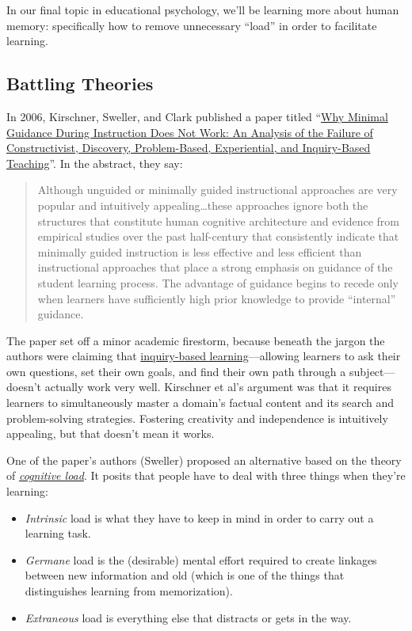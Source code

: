 
In our final topic in educational psychology, we'll be learning more
about human memory: specifically how to remove unnecessary ``load'' in
order to facilitate learning.

\subsection{Battling Theories}\label{battling-theories}

In 2006, Kirschner, Sweller, and Clark published a paper titled
``\href{http://www.cogtech.usc.edu/publications/kirschner\_Sweller\_Clark.pdf}{Why
Minimal Guidance During Instruction Does Not Work: An Analysis of the
Failure of Constructivist, Discovery, Problem-Based, Experiential, and
Inquiry-Based Teaching}''. In the abstract, they say:

\begin{quote}
Although unguided or minimally guided instructional approaches are very
popular and intuitively appealing\ldots{}these approaches ignore both
the structures that constitute human cognitive architecture and evidence
from empirical studies over the past half-century that consistently
indicate that minimally guided instruction is less effective and less
efficient than instructional approaches that place a strong emphasis on
guidance of the student learning process. The advantage of guidance
begins to recede only when learners have sufficiently high prior
knowledge to provide ``internal'' guidance.
\end{quote}

The paper set off a minor academic firestorm, because beneath the jargon
the authors were claiming that
\href{https://en.wikipedia.org/wiki/Inquiry-based\_learning}{inquiry-based
learning}---allowing learners to ask their own questions, set their own
goals, and find their own path through a subject---doesn't actually work
very well. Kirschner et al's argument was that it requires learners to
simultaneously master a domain's factual content and its search and
problem-solving strategies. Fostering creativity and independence is
intuitively appealing, but that doesn't mean it works.

One of the paper's authors (Sweller) proposed an alternative based on
the theory of
\emph{\href{https://en.wikipedia.org/wiki/Cognitive\_load}{cognitive
load}}. It posits that people have to deal with three things when
they're learning:

\begin{itemize}
\itemsep1pt\parskip0pt
\item
  \emph{Intrinsic} load is what they have to keep in mind in order to
  carry out a learning task.
\item
  \emph{Germane} load is the (desirable) mental effort required to
  create linkages between new information and old (which is one of the
  things that distinguishes learning from memorization).
\item
  \emph{Extraneous} load is everything else that distracts or gets in
  the way.
\end{itemize}

